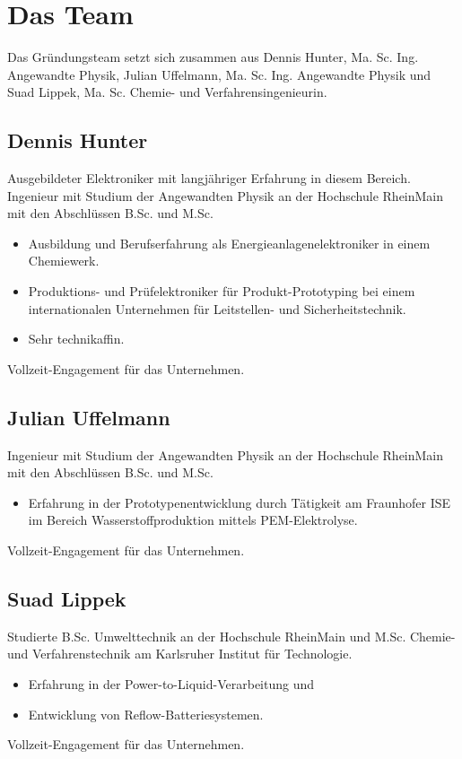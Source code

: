 \chapter{Das Team}

Das Gründungsteam setzt sich zusammen aus Dennis Hunter, Ma. Sc. Ing. Angewandte Physik, Julian Uffelmann, Ma. Sc. Ing. Angewandte Physik und Suad Lippek, Ma. Sc. Chemie- und Verfahrensingenieurin.

\section{Dennis Hunter}

    Ausgebildeter Elektroniker mit langjähriger Erfahrung in diesem Bereich.
    Ingenieur mit Studium der Angewandten Physik an der Hochschule RheinMain mit den Abschlüssen B.Sc. und M.Sc.
    \begin{itemize}
        \item Ausbildung und Berufserfahrung als Energieanlagenelektroniker in einem Chemiewerk.
        \item Produktions- und Prüfelektroniker für Produkt-Prototyping bei einem internationalen Unternehmen für Leitstellen- und Sicherheitstechnik.
        \item Sehr technikaffin.
    \end{itemize}
    Vollzeit-Engagement für das Unternehmen.

\section{Julian Uffelmann}

    Ingenieur mit Studium der Angewandten Physik an der Hochschule RheinMain mit den Abschlüssen B.Sc. und M.Sc.
    \begin{itemize}
        \item Erfahrung in der Prototypenentwicklung durch Tätigkeit am Fraunhofer ISE im Bereich Wasserstoffproduktion mittels PEM-Elektrolyse.
    \end{itemize}
    Vollzeit-Engagement für das Unternehmen.

\section{Suad Lippek}

    Studierte B.Sc. Umwelttechnik an der Hochschule RheinMain und M.Sc. Chemie- und Verfahrenstechnik am Karlsruher Institut für Technologie.
    \begin{itemize}
        \item Erfahrung in der Power-to-Liquid-Verarbeitung und
        \item Entwicklung von Reflow-Batteriesystemen.
    \end{itemize}
    Vollzeit-Engagement für das Unternehmen.